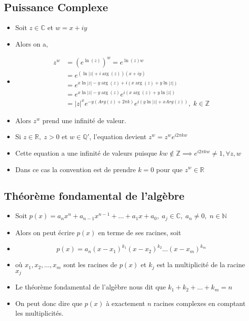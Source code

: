 \subsection*{Puissance Complexe}
\begin{itemize} 
    \item[] Soit $z \in \mathbb{C}$ et $w= x + iy$
    \item[] Alors on a,
    \item[] \begin{align*}
        z^w &= \left( e^{\ln(z)}\right)^{w} = e^{\ln(z)w} \\ 
        &= e^{\left(\ln|z| + i\arg(z)\right)\left(x + iy\right)} \\
        &= e^{ x\ln|z| - y\arg(z) + i\left( x\arg(z) + y\ln|z|\right) } \\
        &= e^{x\ln|z| - y\arg(z)}e^{i\left( x\arg(z) + y\ln|z| \right)} \\
        &= |z|^{x} e^{-y\left( Arg(z) + 2\pi k \right)} e^{ i \left( y\ln|z| + xArg(z) \right) }, \; k \in \mathbb{Z}
    \end{align*}
    \item[] Alors $z^w$ prend une infinité de valeur.
    \item[] Si $z \in \mathbb{R},\; z > 0$ et $w \in \mathbb{Q}'$, l'equation devient $z^w = z^w e^{i 2 \pi k w}$ 
    \item[] Cette equation a une infinité de valeurs puisque $kw \not\in \mathbb{Z} \implies e^{i 2 \pi k w} \neq 1, \forall z, w$
    \item[] Dans ce cas la convention est de prendre $k = 0$ pour que $z^w \in \mathbb{R}$
\end{itemize}   


\subsection*{Théorème fondamental de l'algèbre}
\begin{itemize}
    \item[] Soit $p(x) = a_n x^n + a_{n-1} x^{n-1} + \dots + a_1 x + a_0, \; a_j \in \mathbb{C}, \; a_n \neq 0, \; n \in \mathbb{N}$
    \item[] Alors on peut écrire $p(x)$ en terme de ses racines, soit
    \item[] \begin{equation*}
        p(x) = a_n(x - x_1)^{k_1} (x - x_2)^{k_2} \dots (x - x_m)^{k_m}
    \end{equation*}
    \item[] où $x_1, x_2, \dots ,x_m$ sont les racines de $p(x)$ et $k_j$ est la multiplicité de la racine $x_j$
    \item[] Le théorème fondamental de l'algèbre nous dit que $k_1 + k_2 + \dots + k_m = n$
    \item[] On peut donc dire que $p(x)$ à exactement $n$ racines complexes en comptant les multiplicités.
\end{itemize}